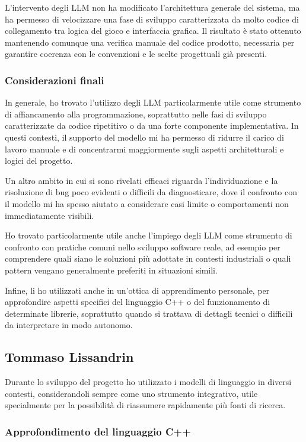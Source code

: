 \documentclass[a4paper,11pt]{article}
\begin{document}
L'intervento degli LLM non ha modificato l'architettura generale del sistema, ma ha permesso di velocizzare una fase di sviluppo caratterizzata da molto codice di collegamento tra logica del gioco e interfaccia grafica. 
Il risultato è stato ottenuto mantenendo comunque una verifica manuale del codice prodotto, necessaria per garantire coerenza con le convenzioni e le scelte progettuali già presenti.

\subsubsection{Considerazioni finali}

In generale, ho trovato l'utilizzo degli LLM particolarmente utile come strumento di affiancamento alla programmazione, soprattutto nelle fasi di sviluppo caratterizzate da codice ripetitivo o da una forte componente implementativa. In questi contesti, il supporto del modello mi ha permesso di ridurre il carico di lavoro manuale e di concentrarmi maggiormente sugli aspetti architetturali e logici del progetto.

Un altro ambito in cui si sono rivelati efficaci riguarda l'individuazione e la risoluzione di bug poco evidenti o difficili da diagnosticare, dove il confronto con il modello mi ha spesso aiutato a considerare casi limite o comportamenti non immediatamente visibili.

Ho trovato particolarmente utile anche l'impiego degli LLM come strumento di confronto con pratiche comuni nello sviluppo software reale, ad esempio per comprendere quali siano le soluzioni più adottate in contesti industriali o quali pattern vengano generalmente preferiti in situazioni simili.

Infine, li ho utilizzati anche in un'ottica di apprendimento personale, per approfondire aspetti specifici del linguaggio C++ 
o del funzionamento di determinate librerie, soprattutto quando si trattava di dettagli tecnici o difficili da interpretare in modo autonomo.

\subsection{Tommaso Lissandrin}

Durante lo sviluppo del progetto ho utilizzato i modelli di linguaggio in diversi contesti, considerandoli sempre come uno strumento integrativo, utile specialmente per la possibilità di riassumere rapidamente più fonti di ricerca.
\subsubsection{Approfondimento del linguaggio C++}
\end{document}
